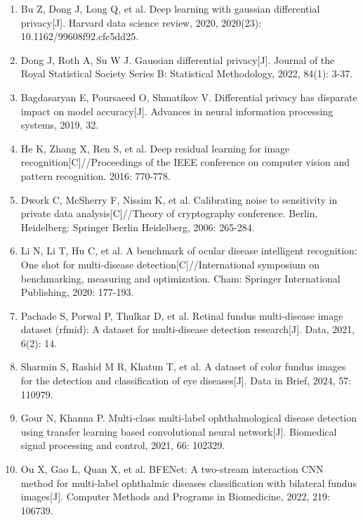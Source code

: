 \begin{enumerate}
\item
  \protect{}\label{_Ref213950443}{}Bu Z, Dong J, Long Q, et al. Deep learning with gaussian differential privacy{[}J{]}. Harvard data science review, 2020, 2020(23): 10.1162/99608f92.cfc5dd25.
\item
  \protect{}\label{_Ref213950449}{}Dong J, Roth A, Su W J. Gaussian differential privacy{[}J{]}. Journal of the Royal Statistical Society Series B: Statistical Methodology, 2022, 84(1): 3-37.
\item
  \protect{}\label{_Ref213950458}{}Bagdasaryan E, Poursaeed O, Shmatikov V. Differential privacy has disparate impact on model accuracy{[}J{]}. Advances in neural information processing systems, 2019, 32.
\item
  \protect{}\label{_RefResNet2016}{}He K, Zhang X, Ren S, et al. Deep residual learning for image recognition{[}C{]}//Proceedings of the IEEE conference on computer vision and pattern recognition. 2016: 770-778.
\item
  \protect{}\label{_Ref214903493}{}Dwork C, McSherry F, Nissim K, et al. Calibrating noise to sensitivity in private data analysis{[}C{]}//Theory of cryptography conference. Berlin, Heidelberg: Springer Berlin Heidelberg, 2006: 265-284.
\item
  \protect{}\label{_Ref213949402}{}Li N, Li T, Hu C, et al. A benchmark of ocular disease intelligent recognition: One shot for multi-disease detection{[}C{]}//International symposium on benchmarking, measuring and optimization. Cham: Springer International Publishing, 2020: 177-193.
\item
  \protect{}\label{_Ref213949409}{}Pachade S, Porwal P, Thulkar D, et al. Retinal fundus multi-disease image dataset (rfmid): A dataset for multi-disease detection research{[}J{]}. Data, 2021, 6(2): 14.
\item
  \protect{}\label{_RefEDID2024}{}Sharmin S, Rashid M R, Khatun T, et al. A dataset of color fundus images for the detection and classification of eye diseases{[}J{]}. Data in Brief, 2024, 57: 110979.
\item
  \protect{}\label{_Ref214903299}{}Gour N, Khanna P. Multi-class multi-label ophthalmological disease detection using transfer learning based convolutional neural network{[}J{]}. Biomedical signal processing and control, 2021, 66: 102329.
\item
  \protect{}\label{_Ref214903327}{}Ou X, Gao L, Quan X, et al. BFENet: A two-stream interaction CNN method for multi-label ophthalmic diseases classification with bilateral fundus images{[}J{]}. Computer Methods and Programs in Biomedicine, 2022, 219: 106739.
\end{enumerate}
